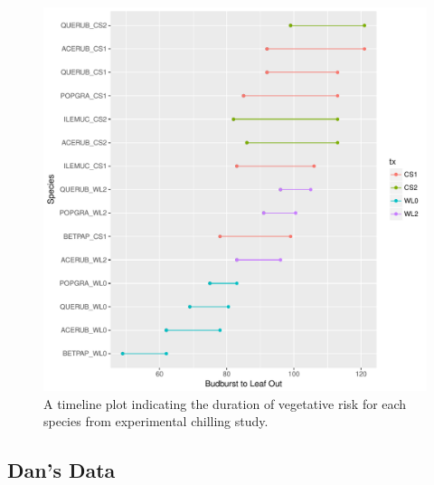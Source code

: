 \documentclass{article}\usepackage[]{graphicx}\usepackage[]{color}
\makeatletter
\def\maxwidth{ %
  \ifdim\Gin@nat@width>\linewidth
    \linewidth
  \else
    \Gin@nat@width
  \fi
}
\makeatother
\begin{document}
\begin{figure}[H]
\includegraphics[width=\maxwidth]{figure/chilling-1} \caption[A timeline plot indicating the duration of vegetative risk for each species from experimental chilling study]{A timeline plot indicating the duration of vegetative risk for each species from experimental chilling study.}\label{fig:chilling}
\end{figure}



\subsection{Dan's Data}
\end{document}
